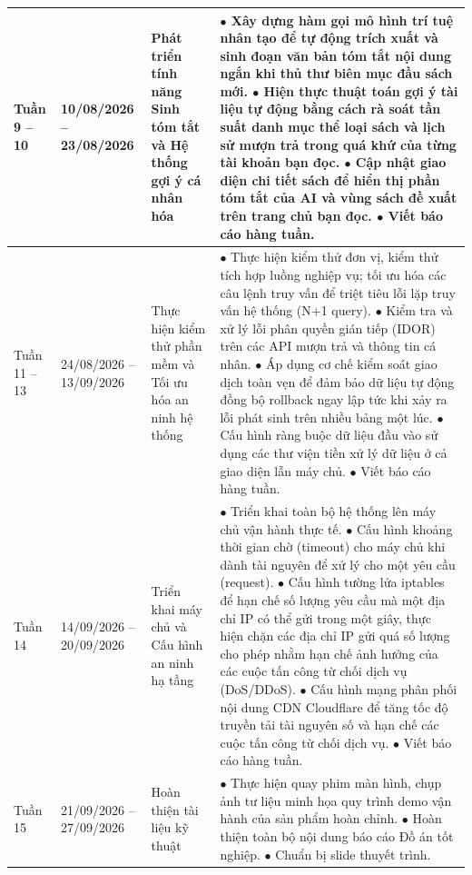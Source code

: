 \begin{longtable}{|p{1.8cm}|p{2.6cm}|p{3.5cm}|p{8.1cm}|}
\hline
Tuần 9 -- 10 & 10/08/2026 -- 23/08/2026 & Phát triển tính năng Sinh tóm tắt và Hệ thống gợi ý cá nhân hóa & $\bullet$ Xây dựng hàm gọi mô hình trí tuệ nhân tạo để tự động trích xuất và sinh đoạn văn bản tóm tắt nội dung ngắn khi thủ thư biên mục đầu sách mới. \newline $\bullet$ Hiện thực thuật toán gợi ý tài liệu tự động bằng cách rà soát tần suất danh mục thể loại sách và lịch sử mượn trả trong quá khứ của từng tài khoản bạn đọc. \newline $\bullet$ Cập nhật giao diện chi tiết sách để hiển thị phần tóm tắt của AI và vùng sách đề xuất trên trang chủ bạn đọc. \newline $\bullet$ Viết báo cáo hàng tuần. \\
\hline
Tuần 11 -- 13 & 24/08/2026 -- 13/09/2026 & Thực hiện kiểm thử phần mềm và Tối ưu hóa an ninh hệ thống & $\bullet$ Thực hiện kiểm thử đơn vị, kiểm thử tích hợp luồng nghiệp vụ; tối ưu hóa các câu lệnh truy vấn để triệt tiêu lỗi lặp truy vấn hệ thống (N+1 query). \newline $\bullet$ Kiểm tra và xử lý lỗi phân quyền gián tiếp (IDOR) trên các API mượn trả và thông tin cá nhân. \newline $\bullet$ Áp dụng cơ chế kiểm soát giao dịch toàn vẹn để đảm bảo dữ liệu tự động đồng bộ rollback ngay lập tức khi xảy ra lỗi phát sinh trên nhiều bảng một lúc. \newline $\bullet$ Cấu hình ràng buộc dữ liệu đầu vào sử dụng các thư viện tiền xử lý dữ liệu ở cả giao diện lẫn máy chủ. \newline $\bullet$ Viết báo cáo hàng tuần. \\
\hline
Tuần 14 & 14/09/2026 -- 20/09/2026 & Triển khai máy chủ và Cấu hình an ninh hạ tầng & $\bullet$ Triển khai toàn bộ hệ thống lên máy chủ vận hành thực tế. \newline $\bullet$ Cấu hình khoảng thời gian chờ (timeout) cho máy chủ khi dành tài nguyên để xử lý cho một yêu cầu (request). \newline $\bullet$ Cấu hình tường lửa iptables để hạn chế số lượng yêu cầu mà một địa chỉ IP có thể gửi trong một giây, thực hiện chặn các địa chỉ IP gửi quá số lượng cho phép nhằm hạn chế ảnh hưởng của các cuộc tấn công từ chối dịch vụ (DoS/DDoS). \newline $\bullet$ Cấu hình mạng phân phối nội dung CDN Cloudflare để tăng tốc độ truyền tải tài nguyên số và hạn chế các cuộc tấn công từ chối dịch vụ. \newline $\bullet$ Viết báo cáo hàng tuần. \\
\hline
Tuần 15 & 21/09/2026 -- 27/09/2026 & Hoàn thiện tài liệu kỹ thuật & $\bullet$ Thực hiện quay phim màn hình, chụp ảnh tư liệu minh họa quy trình demo vận hành của sản phẩm hoàn chỉnh. \newline $\bullet$ Hoàn thiện toàn bộ nội dung báo cáo Đồ án tốt nghiệp. \newline $\bullet$ Chuẩn bị slide thuyết trình.  \\
\hline
\end{longtable}

\bigskip
